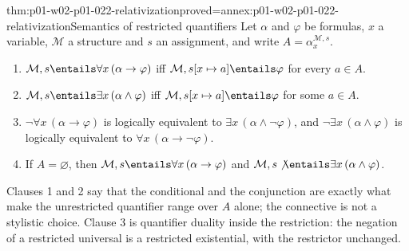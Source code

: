 \begin{hbtheorem}{thm:p01-w02-p01-022-relativization}{proved=annex:p01-w02-p01-022-relativization}{Semantics of restricted quantifiers}
Let \(\alpha\) and \(\varphi\) be formulas, \(x\) a variable, \(\mathcal M\) a
structure and \(s\) an assignment, and write
\(A=\alpha^{\mathcal M,s}_x\).
\begin{enumerate}
  \item \(\mathcal M,s\entails\forall x\,(\alpha\to\varphi)\) iff
        \(\mathcal M,s[x\mapsto a]\entails\varphi\) for every \(a\in A\).
  \item \(\mathcal M,s\entails\exists x\,(\alpha\land\varphi)\) iff
        \(\mathcal M,s[x\mapsto a]\entails\varphi\) for some \(a\in A\).
  \item \(\neg\forall x\,(\alpha\to\varphi)\) is logically equivalent to
        \(\exists x\,(\alpha\land\neg\varphi)\), and
        \(\neg\exists x\,(\alpha\land\varphi)\) is logically equivalent to
        \(\forall x\,(\alpha\to\neg\varphi)\).
  \item If \(A=\varnothing\), then \(\mathcal M,s\entails\forall x\,
        (\alpha\to\varphi)\) and \(\mathcal M,s\not\entails\exists x\,
        (\alpha\land\varphi)\).
\end{enumerate}
\end{hbtheorem}

Clauses 1 and 2 say that the conditional and the conjunction are exactly
what make the unrestricted quantifier range over \(A\) alone; the
connective is not a stylistic choice. Clause 3 is quantifier duality inside
the restriction: the negation of a restricted universal is a restricted
existential, with the restrictor unchanged.

